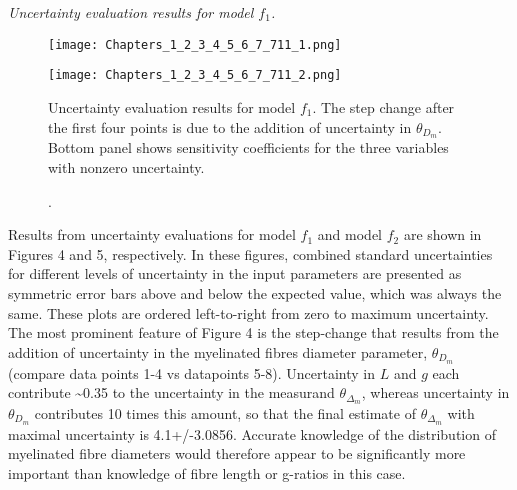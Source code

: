 \emph{Uncertainty evaluation results for model $f_1$.}


\begin{figure}[h!]
\begin{center}
\texttt{[image: Chapters\_1\_2\_3\_4\_5\_6\_7\_711\_1.png]}%
\end{center}
\begin{center}
\texttt{[image: Chapters\_1\_2\_3\_4\_5\_6\_7\_711\_2.png]}%
\end{center}

\caption[\emph{Uncertainty evaluation results for model $f_1$.}]. Uncertainty evaluation results for model $f_1$. The step change after the first four points is due to the addition of uncertainty in $\theta_{D_m}$. Bottom panel shows sensitivity coefficients for the three variables with nonzero uncertainty.
\end{figure}




Results from uncertainty evaluations for model $f_1$ and model $f_2$ are shown in Figures 4 and 5, respectively. In these figures, combined standard uncertainties for different levels of uncertainty in the input parameters are presented as symmetric error bars above and below the expected value, which was always the same. These plots are ordered left-to-right from zero to maximum uncertainty. The most prominent feature of Figure 4 is the step-change that results from the addition of uncertainty in the myelinated fibres diameter
parameter, $\theta_{D_m}$ (compare data points 1-4 vs datapoints 5-8). Uncertainty in $L$ and $g$ each contribute \textasciitilde{}0.35 to the uncertainty in the measurand $\theta_{\Delta_m}$, whereas uncertainty in $\theta_{D_m}$ contributes 10 times this amount, so that the final estimate of $\theta_{\Delta_m}$ with maximal uncertainty is 4.1+/-3.0856. Accurate knowledge of the distribution of myelinated fibre diameters would therefore appear to be significantly more important than knowledge of fibre length or g-ratios in this case.

